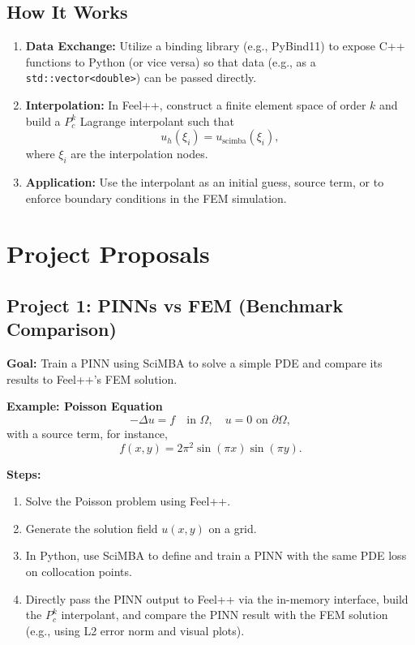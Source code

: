 \documentclass[11pt]{article}
\begin{document}
\subsection{How It Works}
\begin{enumerate}[label=\arabic*.]
    \item \textbf{Data Exchange:} Utilize a binding library (e.g., PyBind11) to expose C++ functions to Python (or vice versa) so that data (e.g., as a \texttt{std::vector<double>}) can be passed directly.
    \item \textbf{Interpolation:} In Feel++, construct a finite element space of order \( k \) and build a \( P_c^k \) Lagrange interpolant such that
    \[
    u_h(\xi_i) = u_{\text{scimba}}(\xi_i),
    \]
    where \(\xi_i\) are the interpolation nodes.
    \item \textbf{Application:} Use the interpolant as an initial guess, source term, or to enforce boundary conditions in the FEM simulation.
\end{enumerate}


\section{Project Proposals}

\subsection{Project 1: PINNs vs FEM (Benchmark Comparison)}
\textbf{Goal:}  
Train a PINN using SciMBA to solve a simple PDE and compare its results to Feel++'s FEM solution.

\textbf{Example: Poisson Equation}
\[
-\Delta u = f \quad \text{in } \Omega, \quad u = 0 \text{ on } \partial\Omega,
\]
with a source term, for instance,
\[
f(x,y) = 2\pi^2 \sin(\pi x) \sin(\pi y).
\]

\textbf{Steps:}
\begin{enumerate}[label=\arabic*.]
    \item Solve the Poisson problem using Feel++.
    \item Generate the solution field \( u(x,y) \) on a grid.
    \item In Python, use SciMBA to define and train a PINN with the same PDE loss on collocation points.
    \item Directly pass the PINN output to Feel++ via the in-memory interface, build the \( P_c^k \) interpolant, and compare the PINN result with the FEM solution (e.g., using L2 error norm and visual plots).
\end{enumerate}
\end{document}

